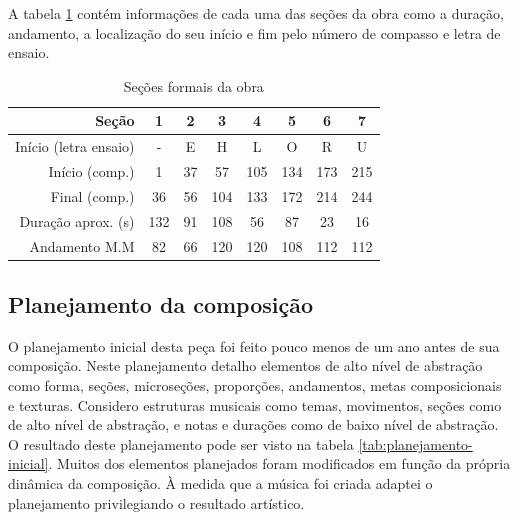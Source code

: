 A tabela \ref{tab:secoes-obra} contém informações de cada uma das
seções da obra como a duração, andamento, a localização do seu início
e fim pelo número de compasso e letra de ensaio.

\begin{table}
  \centering
  \begin{tabular}{r|ccccccc}
    Seção & 1 & 2 & 3 & 4 & 5 & 6 & 7 \\
    \hline
    Início (letra ensaio) & - & E & H & L & O & R & U \\
    Início (comp.) & 1 & 37 & 57 & 105 & 134 & 173 & 215 \\
    Final (comp.) & 36 & 56 & 104 & 133 & 172 & 214 & 244 \\
    Duração aprox. (s) & 132 & 91 & 108 & 56 & 87 & 23 & 16\\
    Andamento M.M & 82 & 66 & 120 & 120 & 108 & 112 & 112 \\
  \end{tabular}
  \caption{Seções formais da obra}
  \label{tab:secoes-obra}
\end{table}

\subsection{Planejamento da composição}
\label{sec:plan-da-comp}

O planejamento inicial desta peça foi feito pouco menos de um ano
antes de sua composição. Neste planejamento detalho elementos de alto
nível de abstração como forma, seções, microseções, proporções,
andamentos, metas composicionais e texturas. Considero estruturas
musicais como temas, movimentos, seções como de alto nível de
abstração, e notas e durações como de baixo nível de abstração. O
resultado deste planejamento pode ser visto na tabela
\ref{tab:planejamento-inicial}. Muitos dos elementos planejados foram
modificados em função da própria dinâmica da composição. À medida que
a música foi criada adaptei o planejamento privilegiando o resultado
artístico.

